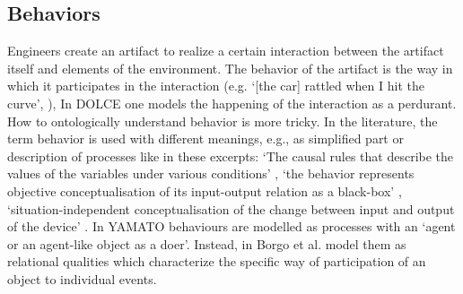 \documentclass[sw]{iosart2x}
\newcommand{\DOLCE}{\textsc{DOLCE}\xspace} %
\newcommand{\YAMATO}{\textsc{YAMATO}\xspace}
\newcommand{\quotes}[1]{`#1'}
\newcommand{\TODO}[1]{{\color{red} #1
}}
\begin{document}



\subsection{Behaviors}
Engineers create an artifact to realize a certain interaction between the artifact itself and elements of the environment. The behavior of the artifact is the way in which it participates in the interaction (e.g. \quotes{[the car] rattled when I hit the curve}, \cite{chandrasekaranFunctionDeviceRepresentation2000}), 
In \DOLCE one models the happening of the interaction as a perdurant. How to ontologically understand behavior is more tricky. 
In the literature, the term behavior is used with different meanings, e.g., as simplified part or description of processes like in these excerpts: \quotes{The causal rules that describe the values of the variables under various conditions} \cite{chandrasekaranFunctionDeviceRepresentation2000}, \quotes{the behavior represents objective conceptualisation of its input-output relation as a black-box} \cite{kitamuraOntologicalModelDevice2006}, \quotes{situation-independent conceptualisation of the change between input and output of the device} \cite{mizoguchiFunctionalOntologyArtifacts2009}. 
In \YAMATO \cite{Mizoguchi2017YAMATOYA} behaviours are modelled as processes with an \quotes{agent or an agent-like object as a doer}. 
Instead, in \cite{borgoFormalOntologicalPerspective2009} Borgo et al.  model them as relational qualities which characterize the specific way of participation of an object to individual events. 
\end{document}
